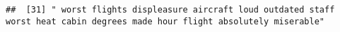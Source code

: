 \documentclass[
]{article}
\begin{document}
\begin{verbatim}
##  [31] " worst flights displeasure aircraft loud outdated staff worst heat cabin degrees made hour flight absolutely miserable"                                                                                                                                                                                                                                                                                                                                                                                                                                                                                                                                                                                                                                                                                                                                                                                                                                                                                                                                                                                                                                                                                                                                                                                                                                                                                                                                                                                                                                                                                                                                                                                                                                                                        

\end{verbatim}
\end{document}
